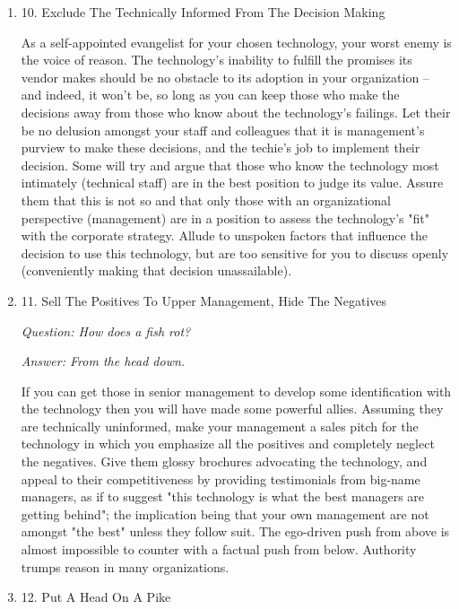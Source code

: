 \documentclass{article}
\begin{document}
\begin{enumerate}
\begin{enumerate}
\item 10. Exclude The Technically Informed From The Decision Making
\label{sec:orgheadline46}

As a self-appointed evangelist for your chosen technology, your worst
enemy is the voice of reason. The technology's inability to fulfill the
promises its vendor makes should be no obstacle to its adoption in your
organization -- and indeed, it won't be, so long as you can keep those
who make the decisions away from those who know about the technology's
failings. Let their be no delusion amongst your staff and colleagues
that it is management's purview to make these decisions, and the
techie's job to implement their decision. Some will try and argue that
those who know the technology most intimately (technical staff) are in
the best position to judge its value. Assure them that this is not so
and that only those with an organizational perspective (management) are
in a position to assess the technology's "fit" with the corporate
strategy. Allude to unspoken factors that influence the decision to use
this technology, but are too sensitive for you to discuss openly
(conveniently making that decision unassailable).

\item 11. Sell The Positives To Upper Management, Hide The Negatives
\label{sec:orgheadline47}

\emph{Question: How does a fish rot?}

\emph{Answer: From the head down.}

If you can get those in senior management to develop some identification
with the technology then you will have made some powerful allies.
Assuming they are technically uninformed, make your management a sales
pitch for the technology in which you emphasize all the positives and
completely neglect the negatives. Give them glossy brochures advocating
the technology, and appeal to their competitiveness by providing
testimonials from big-name managers, as if to suggest "this technology
is what the best managers are getting behind"; the implication being
that your own management are not amongst "the best" unless they follow
suit. The ego-driven push from above is almost impossible to counter
with a factual push from below. Authority trumps reason in many
organizations.

\item 12. Put A Head On A Pike
\label{sec:orgheadline48}


\end{enumerate}
\end{enumerate}
\end{document}
